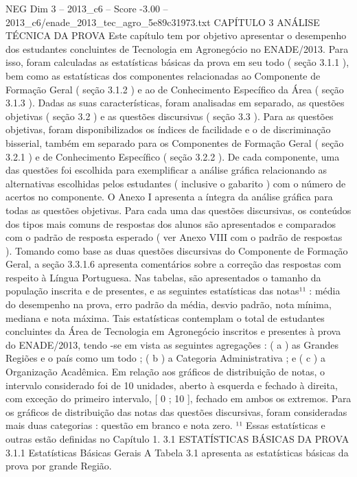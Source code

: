 \begin{textsample}{NEG Dim 3 – 2013\_c6 – Score -3.00 – 2013\_c6/enade\_2013\_tec\_agro\_5e89c31973.txt}  \label{ex:f3_neg_050}
CAPÍTULO 3 ANÁLISE TÉCNICA DA PROVA Este capítulo tem por objetivo apresentar o desempenho dos estudantes concluintes de Tecnologia em Agronegócio no ENADE/2013.
Para isso, foram calculadas as estatísticas básicas da prova em seu todo ( seção 3.1.1 ), bem como as estatísticas dos componentes relacionadas ao Componente de Formação Geral ( seção 3.1.2 ) e ao de Conhecimento Específico da Área ( seção 3.1.3 ).
Dadas as suas características, foram analisadas em separado, as questões objetivas ( seção 3.2 ) e as questões discursivas ( seção 3.3 ).
Para as questões objetivas, foram disponibilizados os índices de facilidade e o de discriminação bisserial, também em separado para os Componentes de Formação Geral ( seção 3.2.1 ) e de Conhecimento Específico ( seção 3.2.2 ).
De cada componente, uma das questões foi escolhida para exemplificar a análise gráfica relacionando as alternativas escolhidas pelos estudantes ( inclusive o gabarito ) com o número de acertos no componente.
O Anexo I apresenta a íntegra da análise gráfica para todas as questões objetivas.
Para cada uma das questões discursivas, os conteúdos dos tipos mais comuns de respostas dos alunos são apresentados e comparados com o padrão de resposta esperado ( ver Anexo VIII com o padrão de respostas ).
Tomando como base as duas questões discursivas do Componente de Formação Geral, a seção 3.3.1.6 apresenta comentários sobre a correção das respostas com respeito à Língua Portuguesa.
Nas tabelas, são apresentados o tamanho da população inscrita e de presentes, e as seguintes estatísticas das notas¹¹ : média do desempenho na prova, erro padrão da média, desvio padrão, nota mínima, mediana e nota máxima.
Tais estatísticas contemplam o total de estudantes concluintes da Área de Tecnologia em Agronegócio inscritos e presentes à prova do ENADE/2013, tendo -se em vista as seguintes agregações : ( a ) as Grandes Regiões e o país como um todo ; ( b ) a Categoria Administrativa ; e ( c ) a Organização Acadêmica.
Em relação aos gráficos de distribuição de notas, o intervalo considerado foi de 10 unidades, aberto à esquerda e fechado à direita, com exceção do primeiro intervalo, [ 0 ; 10 ], fechado em ambos os extremos.
Para os gráficos de distribuição das notas das questões discursivas, foram consideradas mais duas categorias : questão em branco e nota zero. ¹¹ Essas estatísticas e outras estão definidas no Capítulo 1. 3.1 ESTATÍSTICAS BÁSICAS DA PROVA 3.1.1 Estatísticas Básicas Gerais A Tabela 3.1 apresenta as estatísticas básicas da prova por grande Região.

\end{textsample}
